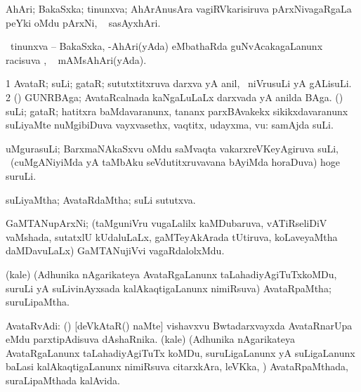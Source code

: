 {{{{{{{{{{{{{{\bentry 
{} 
\gl{\nA}
\expl{}
\bmng
\emng
\eentry

\bentry
{} 
\gl{\saupa}
\expl{}
\bmng
 \eng{-} AhAri; \eng{-} BakaSxka; \eng{-} tinunxva; AhArAnusAra vagiRVkarisiruva pArxNivagaRgaLa peYki oMdu pArxNi, \udA\  sasAyxhAri. 
\emng
\eentry

\bentry
{} 
\gl{\saupa}
\expl{}
\bmng
 \sA\ tinunxva -- BakaSxka, -AhAri(yAda) eMbathaRda guNvAcakagaLanunx racisuva \saupa , \udA\  mAMsAhAri(yAda). 
\emng
\eentry

\bentry
{} 
\gl{\nA}
\bmng
\bnum
\num{1} AvataR; suLi; gataR; sututxtitxruva darxva yA anil, \kanmu\ niVrusuLi yA gALisuLi. 
\num{2} (\Bwvi) GUNRBAga; AvataRcalnada kaNgaLuLaLx darxvada yA anilda BAga. (\rUpa) suLi; gataR; hatitxra baMdavaranunx, tananx parxBAvakekx sikikxdavaranunx suLiyaMte nuMgibiDuva vayxvasethx, vaqtitx, udayxma, \mo vu:  samAjda suLi. 
\enum
\emng
\eentry
 
\bentry
{} 
\gl{\nA}
\expl{}
\bmng
uMgurasuLi; BarxmaNAkaSxvu oMdu saMvaqta vakarxreVKeyAgiruva suLi, \udA\ (cuMgANiyiMda yA taMbAku seVdutitxruvavana bAyiMda horaDuva) hoge suruLi. 
\emng
\eentry

\bentry 
{} 
\gl{\gu}
\expl{}
\bmng
 suLiyaMtha; AvataRdaMtha; suLi sututxva. 
\emng
\eentry

\bentry 
{} 
\gl{\nA}
\expl{}
\bmng
 GaMTANupArxNi; (taMguniVru \mo vugaLalilx kaMDubaruva, vATiRseliDiV vaMshada, sutatxlU kUdaluLaLx, gaMTeyAkArada tUtiruva, koLaveyaMtha daMDavuLaLx) GaMTANujiVvi vagaRdalolxMdu. 
\emng
\eentry

\bentry
{} 
\gl{\nA}
\expl{}
\bmng
 (kale) (Adhunika nAgarikateya AvataRgaLanunx taLahadiyAgiTuTxkoMDu, suruLi yA suLivinAyxsada kalAkaqtigaLanunx nimiRsuva) AvataRpaMtha; suruLipaMtha. 
\emng
\eentry

\bentry 
{} 
\gl{\nA}
\expl{}
\bmng
 AvataRvAdi: 
\banum
{} (\tashA) [deVkAtaR() naMte] vishavxvu Bwtadarxvayxda AvataRnarUpa eMdu parxtipAdisuva dAshaRnika. 
 (kale) (Adhunika nAgarikateya AvataRgaLanunx taLahadiyAgiTuTx koMDu, suruLigaLanunx yA suLigaLanunx baLasi kalAkaqtigaLanunx nimiRsuva citarxkAra, leVKka, \mo) AvataRpaMthada, suraLipaMthada kalAvida. 
\eanum
\emng
\eentry

}}}}}}}}}}}}}}
